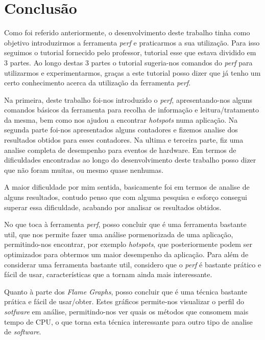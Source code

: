 \documentclass[conference,compsoc]{IEEEtran}
\begin{document}

\section{Conclusão}
Como foi referido anteriormente, o desenvolvimento deste trabalho tinha como objetivo introduzirmos a ferramenta \textit{perf} e praticarmos a sua utilização. Para isso seguimos o tutorial fornecido pelo professor, tutorial esse que estava dividido em 3 partes. Ao longo destas 3 partes o tutorial sugeria-nos comandos do \textit{perf} para utilizarmos e experimentarmos, graças a este tutorial posso dizer que já tenho um certo conhecimento acerca da utilização da ferramenta \textit{perf}.

Na primeira, deste trabalho foi-nos introduzido o \textit{perf}, apresentando-nos alguns comandos básicos da ferramenta para recolha de informação e leitura/tratamento da mesma, bem como nos ajudou a encontrar \textit{hotspots} numa aplicação. Na segunda parte foi-nos apresentados alguns contadores e fizemos analise dos resultados obtidos para esses contadores. Na ultima e terceira parte, fiz uma analise completa de desempenho para eventos de hardware. Em termos de dificuldades encontradas ao longo do desenvolvimento  deste trabalho posso dizer que não foram muitas, ou mesmo quase nenhumas. 

A maior dificuldade por mim sentida, basicamente foi em termos de analise de alguns resultados, contudo penso que com alguma pesquisa e esforço consegui superar essa dificuldade, acabando por analisar os resultados obtidos. 

No que toca à ferramenta \textit{perf}, posso concluir que é uma ferramenta bastante util, que nos permite fazer uma análise pormenorizada de uma aplicação, permitindo-nos encontrar, por exemplo \textit{hotspots}, que posteriormente podem ser optimizados para obtermos um maior desempenho da aplicação. Para além de considerar uma ferramenta bastante util, considero que o \textit{perf} é bastante prático e fácil de usar, características que a tornam ainda mais interessante.

Quanto à parte dos \textit{Flame Graphs}, posso concluir que é uma técnica bastante prática e fácil de usar/obter. Estes gráficos permite-nos visualizar o perfil do \textit{sotfware} em análise, permitindo-nos ver quais os métodos que consomem mais tempo de CPU, o que torna esta técnica interessante para outro tipo de analise de \textit{software}.
\end{document}
